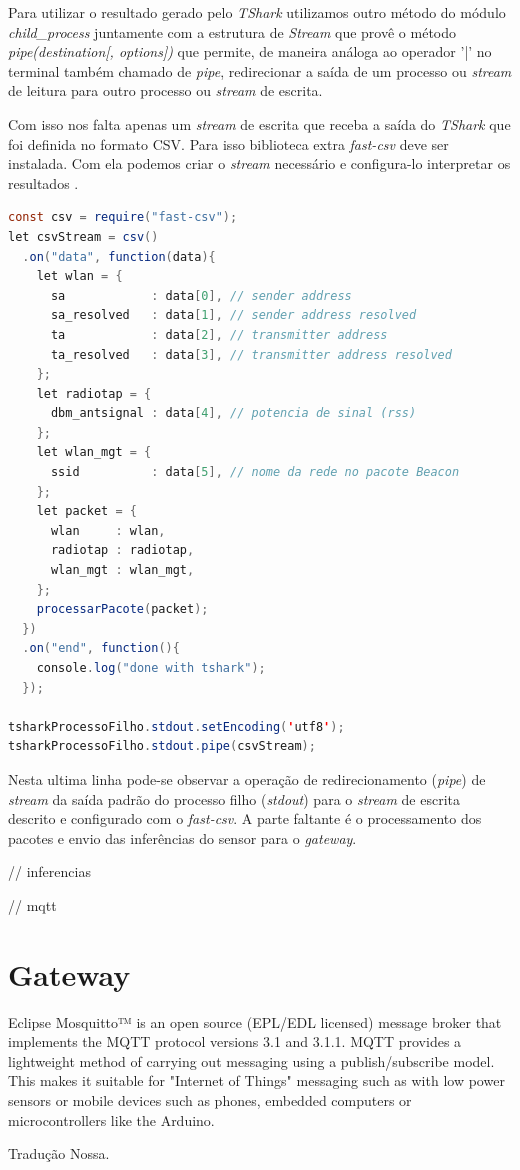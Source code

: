 Para utilizar o resultado gerado pelo \emph{TShark} utilizamos outro método do
módulo \emph{child\_process} juntamente com a estrutura de \emph{Stream}
\cite{stream} que provê o método \emph{pipe(destination[, options])} que permite,
de maneira análoga ao operador '|' no terminal também chamado de \emph{pipe},
redirecionar a saída de um processo ou \emph{stream} de leitura para outro
processo ou \emph{stream} de escrita.

Com isso nos falta apenas um \emph{stream} de escrita que receba a saída do
\emph{TShark} que foi definida no formato CSV. Para isso biblioteca extra
\emph{fast-csv} deve ser instalada. Com ela podemos criar o \emph{stream}
necessário e configura-lo interpretar os resultados \cite{fast-csv}.

\begin{lstlisting}[language=java]
const csv = require("fast-csv");
let csvStream = csv()
  .on("data", function(data){
    let wlan = {
      sa            : data[0], // sender address
      sa_resolved   : data[1], // sender address resolved
      ta            : data[2], // transmitter address
      ta_resolved   : data[3], // transmitter address resolved
    };
    let radiotap = {
      dbm_antsignal : data[4], // potencia de sinal (rss)
    };
    let wlan_mgt = {
      ssid          : data[5], // nome da rede no pacote Beacon
    };
    let packet = {
      wlan     : wlan,
      radiotap : radiotap,
      wlan_mgt : wlan_mgt,
    };
    processarPacote(packet);
  })
  .on("end", function(){
    console.log("done with tshark");
  });

tsharkProcessoFilho.stdout.setEncoding('utf8');
tsharkProcessoFilho.stdout.pipe(csvStream);
\end{lstlisting}

Nesta ultima linha pode-se observar a operação de redirecionamento (\emph{pipe})
de \emph{stream} da saída padrão do processo filho (\emph{stdout}) para o
\emph{stream} de escrita descrito e configurado com o \emph{fast-csv}. A parte
faltante é o processamento dos pacotes e envio das inferências do sensor para o
\emph{gateway}.

// inferencias

// mqtt

\section{Gateway}
\label{sec:app-gw}

\begin{citacao}

	Eclipse Mosquitto™ is an open source (EPL/EDL licensed) message broker that
	implements the MQTT protocol versions 3.1 and 3.1.1. MQTT provides a lightweight
	method of carrying out messaging using a publish/subscribe model. This makes it
	suitable for "Internet of Things" messaging such as with low power sensors or
	mobile devices such as phones, embedded computers or microcontrollers like the
	Arduino. \

	 Tradução Nossa.
\end{citacao}


